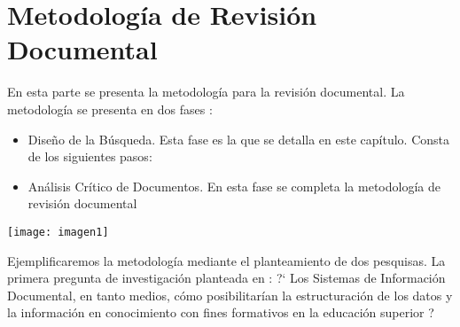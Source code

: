 
\setchapterpreamble[u]{\margintoc}

\chapter{Metodolog\'ia de Revisi\'on Documental }
\label{ch:met-RevDoc}

       En esta parte se presenta la metodología para la revisión documental. La metodología se presenta en dos fases :  

\begin{itemize}
	\item Diseño de la Búsqueda. Esta fase es la que se detalla en este cap\'itulo. Consta de los siguientes pasos:  
	\item Análisis Crítico de Documentos. En esta fase se completa la metodolog\'ia de revisi\'on documental
\end{itemize} 

\begin{marginfigure}[-3cm]%
	\texttt{[image: imagen1]}
\end{marginfigure} 

Ejemplificaremos la metodología mediante el planteamiento de dos pesquisas. La primera pregunta de  investigación planteada en  :
 ?` Los Sistemas de Información Documental, en tanto medios, cómo posibilitarían la estructuración de los datos y la información en conocimiento con fines formativos en la educación superior ?


